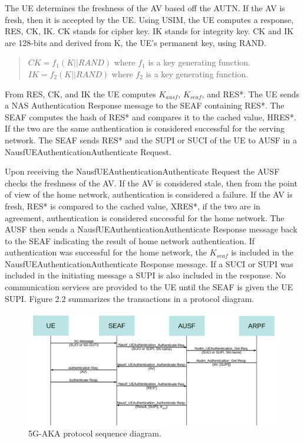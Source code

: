 \documentclass[10pt, pdftex]{article}
\begin{document}
The UE determines the freshness of the AV based off the AUTN.  If the AV is fresh, then it is accepted by the UE.  Using USIM, the UE computes a response, RES, CK, IK.  CK stands for cipher key.  IK stands for integrity key.  CK and IK are 128-bits and derived from K, the UE's permanent key, using RAND.  
\begin{quote}
	$CK = f_1(K||RAND) $ where $ f_1 $ is a key generating function.
	\newline
	$IK = f_2(K||RAND) $ where $ f_2 $ is a key generating function.
\end{quote} 
From RES, CK, and IK the UE computes $K_{ausf}$, $K_{seaf}$, and RES*.  The UE sends a NAS Authentication Response message to the SEAF containing RES*.  The SEAF computes the hash of RES* and compares it to the cached value, HRES*.  If the two are the same authentication is considered successful for the serving network.  The SEAF sends RES* and the SUPI or SUCI of the UE to AUSF in a Nausf\textunderscore UEAuthentication\textunderscore Authenticate Request.  

Upon receiving the Nausf\textunderscore UEAuthentication\textunderscore Authenticate Request the AUSF checks the freshness of the AV.  If the AV is considered stale, then from the point of view of the home network, authentication is considered a failure.  If the AV is fresh, RES* is compared to the cached value, XRES*, if the two are in agreement, authentication is considered successful for the home network.  The AUSF then sends a Nausf\textunderscore UEAuthentication\textunderscore Authenticate Response message back to the SEAF indicating the result of home network authentication.  If authentication was successful for the home network, the $K_{seaf}$ is included in the Nausf\textunderscore UEAuthentication\textunderscore Authenticate Response message.  If a SUCI or SUPI was included in the initiating message a SUPI is also included in the response.  No communication services are provided to the UE until the SEAF is given the UE SUPI.  Figure 2.2 summarizes the transactions in a protocol diagram.

\begin{figure}[h]
	\begin{center}
		\includegraphics[scale=0.21]{Figure2_2.png}
	\end{center}
	\caption{5G-AKA protocol sequence diagram.}
\end{figure}
\end{document}
